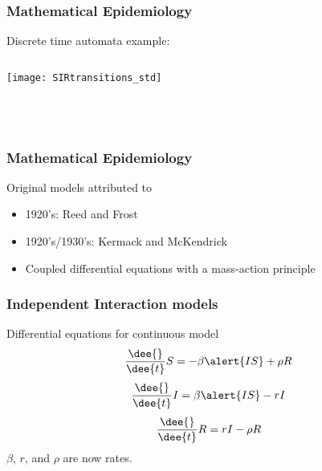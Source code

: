 \begin{frame}
  \frametitle{Mathematical Epidemiology}

  \begin{block}{Discrete time automata example:}
    \medskip
    \begin{columns}
      \begin{column}{0.4\textwidth}
        \texttt{[image: SIRtransitions\_std]}
      \end{column}
      \begin{column}{0.5\textwidth}

        \bigskip
        \\
        \\
        \\
      \end{column}
    \end{columns}
  \end{block}

\end{frame}


\begin{frame}
  \frametitle{Mathematical Epidemiology}

  \begin{block}{Original models attributed to}
    \begin{itemize}
    \item<2-> 1920's: Reed and Frost
    \item<3-> 1920's/1930's: Kermack and McKendrick\cite{kermack1927a,kermack1932a,kermack1933a}
    \item<4-> Coupled differential equations with a mass-action principle
    \end{itemize}
  \end{block}

\end{frame}

\begin{frame}
  \frametitle{Independent Interaction models}

  \begin{block}{Differential equations for continuous model}
    $$
    \frac{\dee{}}{\dee{t}} S = - \beta  \alert{I S} + \rho R 
    $$
    $$
    \frac{\dee{}}{\dee{t}} I=  \beta \alert{I S} - r I 
    $$
    $$
    \frac{\dee{}}{\dee{t}} R=  r I - \rho R 
    $$
    $\beta$, $r$, and $\rho$ are now \alert{rates}.
  \end{block}
  
\end{frame}

